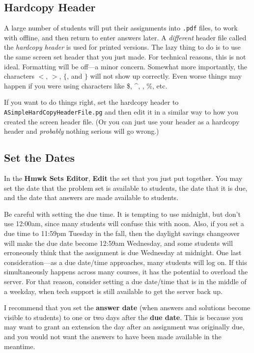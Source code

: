 \documentclass[12pt]{article}
\newcommand{\menu}[1]{\textbf{#1}}
\newcommand{\HSE}{\menu{Hmwk Sets Editor}}
\begin{document}
\subsection{Hardcopy Header}

A large number of students will put their assignments into \texttt{.pdf} files, to work with offline, and then return to enter answers later.
A \emph{different} header file called the \emph{hardcopy header} is used for printed versions.
The lazy thing to do is to use the same screen set header that you just made.
For technical reasons, this is not ideal.
Formatting will be off---a minor concern.
Somewhat more importantly, the characters $<$, $>$, $\{$, and $\}$ will not show up correctly.
Even worse things may happen if you were using characters like \$, \^{}, \textunderscore, \%, etc.

If you want to do things right, set the hardcopy header to \texttt{ASimpleHardCopyHeaderFile.pg} and then edit it in a similar way to how you created the screen header file.
(Or you can just use your header as a hardcopy header and \emph{probably} nothing serious will go wrong.)

\subsection{Set the Dates}
In the \HSE, \menu{Edit} the set that you just put together.
You may set the date that the problem set is available to students, the date that it is due, and the date that answers are made available to students.

Be careful with setting the due time.
It is tempting to use midnight, but don't use 12:00{\sc am}, since many students will confuse this with noon.
Also, if you set a due time to 11:59{\sc pm} Tuesday in the fall, then the daylight savings changeover will make the due date become 12:59{\sc am} Wednesday, and some students will erroneously think that the assignment is due Wednesday at midnight.
One last consideration---as a due date/time approaches, many students will log on.
If this simultaneously happens across many courses, it has the potential to overload the server.
For that reason, consider setting a due date/time that is in the middle of a weekday, when tech support is still available to get the server back up.

I recommend that you set the \menu{answer date} (when answers and solutions become visible to students) to one or two days after the \menu{due date}.
This is because you may want to grant an extension the day after an assignment was originally due, and you would not want the answers to have been made available in the meantime.
\end{document}
